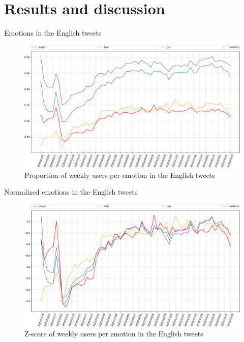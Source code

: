 \documentclass[8pt]{beamer}  %
\begin{document}
\section{Results and discussion}

\begin{frame}{Emotions in the English tweets}

    \begin{figure}[H]
    	\centering
    	\includegraphics[scale=.25]{assets/img/en_4_emotions.svg.pdf}
    	\caption{Proportion of weekly users per emotion in the English tweets}
    	\label{fig:en-4-emotions}
    \end{figure}
    
\end{frame}

\begin{frame}{Normalized emotions in the English tweets}

    \begin{figure}[H]
    	\centering
    	\includegraphics[scale=.25]{assets/img/en_4_emotions_standardized.svg.pdf}
    	\caption{Z-score of weekly users per emotion in the English tweets}
    	\label{fig:en-4-emotions-std}
    \end{figure}
    
\end{frame}
\end{document}
